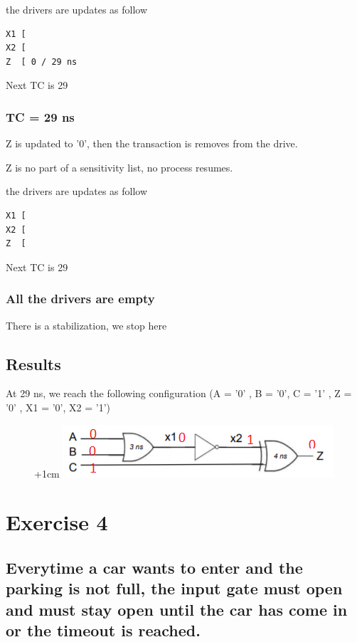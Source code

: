 \documentclass{article}
\begin{document}
the drivers are updates as follow 

\begin{verbatim}
X1 [ 
X2 [ 
Z  [ 0 / 29 ns 
\end{verbatim}

Next TC is 29

\subsubsection{TC = 29 ns}

Z is updated to '0', then the transaction is removes from the drive.

Z is no part of a sensitivity list, no process resumes.

the drivers are updates as follow 

\begin{verbatim}
X1 [ 
X2 [ 
Z  [ 
\end{verbatim}

Next TC is 29

\subsubsection{All the drivers are empty }

There is a stabilization, we stop here

\subsection{Results}

At 29 ns, we reach the following configuration (A = '0' , B = '0', C = '1' , Z = '0' , X1 = '0', X2 = '1')

\begin{figure}[!h]
\advance\leftskip+1cm
\includegraphics[scale=2]{Scheme.PNG}
\end{figure}

\newpage
\section{Exercise 4}

\subsection{Everytime a car wants to enter and the parking is not full, the input gate must open and must stay
open until the car has come in or the timeout is reached. }
\end{document}
